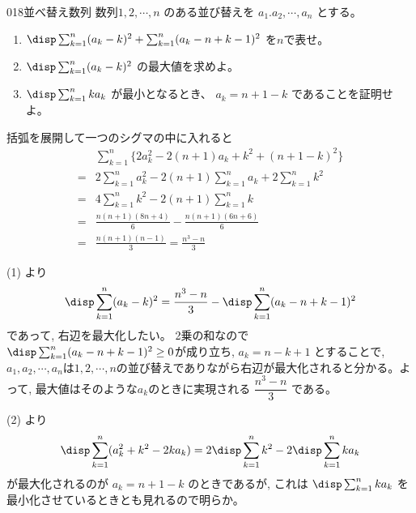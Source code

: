 \begin{thm}{018}{}{並べ替え数列}
 数列$1,2,\cdots, n$ のある並び替えを $a_1.a_2,\cdots , a_n$ とする。\\
 \begin{enumerate}
  \item $\disp \sum_{k=1}^n(a_k-k)^2+\sum^n_{k=1}(a_k-n+k-1)^2$ を$n$で表せ。
  \item $\disp \sum_{k=1}^n(a_k-k)^2$ の最大値を求めよ。
  \item $\disp \sum_{k=1}^nka_k$ が最小となるとき、 $a_k=n+1-k$ であることを証明せよ。
 \end{enumerate}
\end{thm}

括弧を展開して一つのシグマの中に入れると 
\begin{align*}
&\sum_{k=1}^n \{2a_k^2-2(n+1)a_k + k^2 + (n+1-k)^2 \}\\
=& 2\sum_{k=1}^na_k^2 -2(n+1)\sum_{k=1}^na_k + 2\sum_{k=1}^n k^2\\
=& 4\sum_{k=1}^nk^2 - 2(n+1)\sum_{k=1}^nk\\
=& \frac{n(n+1)(8n+4)}{6} - \frac{n(n+1)(6n+6)}{6}\\
=& \frac{n(n+1)(n-1)}{3}=\frac{n^3-n}{3}
\end{align*}

(1) より
\[\disp\sum_{k=1}^n(a_k-k)^2 = \dfrac{n^3-n}{3}-\disp\sum_{k=1}^n (a_k-n+k-1)^2\]
であって, 右辺を最大化したい。 2乗の和なので$\disp\sum_{k=1}^n (a_k-n+k-1)^2\geq 0$が成り立ち, $a_k=n-k+1$ とすることで, $a_1,a_2,\cdots, a_n$は$1,2,\cdots ,n$の並び替えでありながら右辺が最大化されると分かる。よって, 最大値はそのような$a_k$のときに実現される $\dfrac{n^3-n}{3}$ である。

(2) より
\[ \disp\sum_{k=1}^n (a_k^2+k^2 -2ka_k)=2\disp\sum_{k=1}^n k^2 -2\disp\sum_{k=1}^n ka_k\]
が最大化されるのが $a_k=n+1-k$ のときであるが, これは $\disp\sum_{k=1}^n ka_k$ を最小化させているときとも見れるので明らか。

